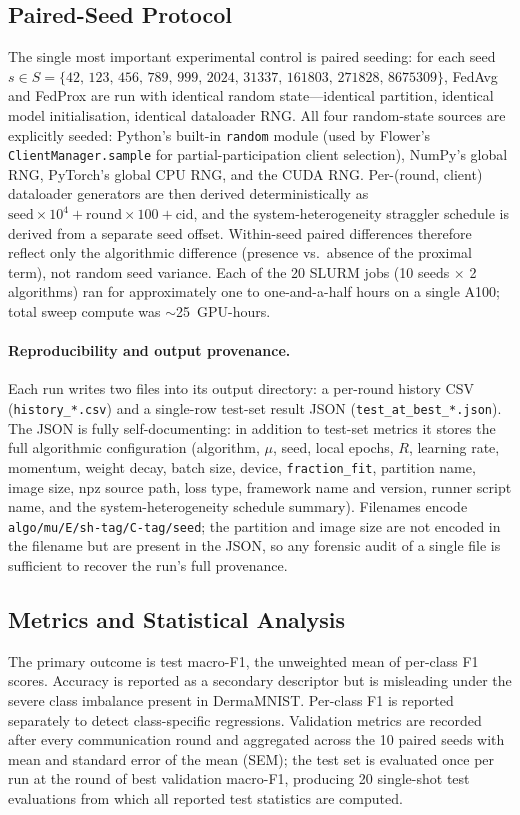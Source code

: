 \documentclass[11pt,a4paper]{article}
\begin{document}
\subsection{Paired-Seed Protocol}\label{sec:protocol}
The single most important experimental control is paired seeding: for
each seed $s \in S = \{42,\, 123,\, 456,\, 789,\, 999,\, 2024,\, 31337,\, 161803,\, 271828,\, 8675309\}$,
FedAvg and FedProx are run with identical random state---identical
partition, identical model initialisation, identical dataloader RNG.
All four random-state sources are explicitly seeded: Python's built-in
\texttt{random} module (used by Flower's \texttt{ClientManager.sample}
for partial-participation client selection), NumPy's global RNG,
PyTorch's global CPU RNG, and the CUDA RNG. Per-(round, client)
dataloader generators are then derived deterministically as
$\text{seed} \times 10^4 + \text{round} \times 100 + \text{cid}$, and
the system-heterogeneity straggler schedule is derived from a separate
seed offset. Within-seed paired differences therefore reflect only the
algorithmic difference (presence vs.\ absence of the proximal term),
not random seed variance. Each of the 20 SLURM jobs (10 seeds $\times$
2 algorithms) ran for approximately one to one-and-a-half hours on a
single A100; total sweep compute was $\sim$25~GPU-hours.

\paragraph{Reproducibility and output provenance.} Each run writes two
files into its output directory: a per-round history CSV
(\texttt{history\_*.csv}) and a single-row test-set result JSON
(\texttt{test\_at\_best\_*.json}). The JSON is fully self-documenting:
in addition to test-set metrics it stores the full algorithmic
configuration (algorithm, $\mu$, seed, local epochs, $R$, learning
rate, momentum, weight decay, batch size, device,
\texttt{fraction\_fit}, partition name, image size, npz source path,
loss type, framework name and version, runner script name, and the
system-heterogeneity schedule summary). Filenames encode
\texttt{algo/mu/E/sh-tag/C-tag/seed}; the partition and image size are
not encoded in the filename but are present in the JSON, so any
forensic audit of a single file is sufficient to recover the run's
full provenance.

\subsection{Metrics and Statistical Analysis}\label{sec:metrics}
The primary outcome is test macro-F1, the unweighted mean of per-class
F1 scores. Accuracy is reported as a secondary descriptor but is
misleading under the severe class imbalance present in DermaMNIST.
Per-class F1 is reported separately to detect class-specific
regressions. Validation metrics are recorded after every communication
round and aggregated across the 10 paired seeds with mean and standard
error of the mean (SEM); the test set is evaluated once per run at the
round of best validation macro-F1, producing 20 single-shot test
evaluations from which all reported test statistics are computed.
\end{document}
